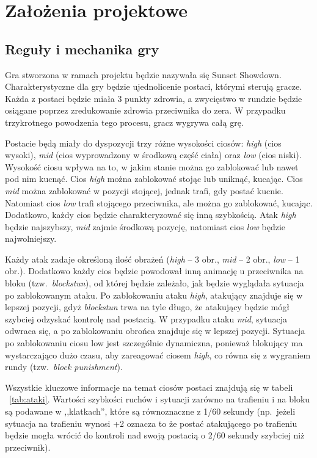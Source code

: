 \chapter{Założenia projektowe}
\section{Reguły i mechanika gry}
Gra stworzona w ramach projektu będzie nazywała się Sunset Showdown. Charakterystyczne dla gry będzie ujednolicenie postaci, którymi sterują gracze. Każda z postaci będzie miała 3 punkty zdrowia, a zwycięstwo w rundzie będzie osiągane poprzez zredukowanie zdrowia przeciwnika do zera. W przypadku trzykrotnego powodzenia tego procesu, gracz wygrywa całą grę. 

Postacie będą miały do dyspozycji trzy różne wysokości ciosów: \emph{high} (cios wysoki), \emph{mid} (cios wyprowadzony w środkową część ciała) oraz \emph{low} (cios niski). Wysokość ciosu wpływa na to, w jakim stanie można go zablokować lub nawet pod nim kucnąć. 
Cios \emph{high} można zablokować stojąc lub uniknąć, kucając. Cios \emph{mid} można zablokować w pozycji stojącej, jednak trafi, gdy postać kucnie. Natomiast cios \emph{low} trafi stojącego przeciwnika, ale można go zablokować, kucając. Dodatkowo, każdy cios będzie charakteryzować się inną szybkością. Atak \emph{high} będzie najszybszy, \emph{mid} zajmie środkową pozycję, natomiast cios \emph{low} będzie najwolniejszy. 

Każdy atak zadaje określoną ilość obrażeń (\emph{high} -- 3 obr., \emph{mid} -- 2 obr., \emph{low} -- 1 obr.). Dodatkowo każdy cios będzie powodował inną animację u przeciwnika na bloku (tzw.~\emph{blockstun}), od której będzie zależało, jak będzie wyglądała sytuacja po zablokowanym ataku. Po zablokowaniu ataku \emph{high}, atakujący znajduje się w lepszej pozycji, gdyż \emph{blockstun} trwa na tyle długo, że atakujący będzie mógł szybciej odzyskać kontrolę nad postacią. W przypadku ataku \emph{mid}, sytuacja odwraca się, a po zablokowaniu obrońca znajduje się w lepszej pozycji. Sytuacja po zablokowaniu ciosu low jest szczególnie dynamiczna, ponieważ blokujący ma wystarczająco dużo czasu, aby zareagować ciosem \emph{high}, co równa się z wygraniem rundy (tzw.~\emph{block punishment}).

Wszystkie kluczowe informacje na temat ciosów postaci znajdują się w tabeli ~\ref{tab:ataki}. Wartości szybkości ruchów i sytuacji zarówno na trafieniu i na bloku są podawane w ,,klatkach'', które są równoznaczne z 1/60 sekundy (np.\ jeżeli sytuacja na trafieniu wynosi +2 oznacza to że postać atakującego po trafieniu będzie mogła wrócić do kontroli nad swoją postacią o 2/60 sekundy szybciej niż przeciwnik).

